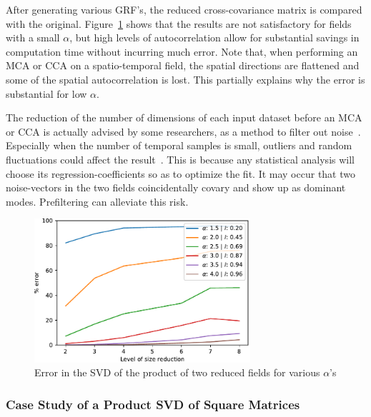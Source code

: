 \documentclass[ijgi,article,submit,moreauthors,pdftex,10pt,a4paper]{Definitions/mdpi}
\begin{document}
After generating various GRF's, the reduced cross-covariance matrix is compared with the original. Figure~\ref{fig:plotRandomisedSizeReducedMatrixProduct} shows that the results are not satisfactory for fields with a small $\alpha$, but high levels of autocorrelation allow for substantial savings in computation time without incurring much error. Note that, when performing an MCA or CCA on a spatio-temporal field, the spatial directions are flattened and some of the spatial autocorrelation is lost. This partially explains why the error is substantial for low $\alpha$.

The reduction of the number of dimensions of each input dataset before an MCA or CCA is actually advised by some researchers, as a method to filter out noise~\cite{Barnett1987}. Especially when the number of temporal samples is small, outliers and random fluctuations could affect the result~\cite{Bretherton1992}. This is because any statistical analysis will choose its regression-coefficients so as to optimize the fit. It may occur that two noise-vectors in the two fields coincidentally covary and show up as dominant modes. Prefiltering can alleviate this risk.

\begin{figure}[H]
\centering
\includegraphics[width=80mm]{Results/plotRandomisedSizeReducedMatrixProduct.pdf}
\caption[Error after reduction]{Error in the SVD of the product of two reduced fields for various $\alpha$'s}
\label{fig:plotRandomisedSizeReducedMatrixProduct}
\end{figure}

\subsubsection{Case Study of a Product SVD of Square Matrices}
\label{sec:Results/Case Study of a Product SVD of Square Matrices}
\end{document}
